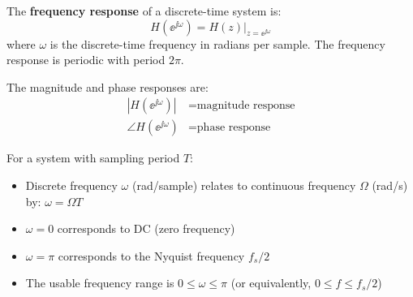 \begin{definitionbox}[title=Definition: Discrete-Time Frequency Response]
The \textbf{frequency response} of a discrete-time system is:
\begin{equation}
H(\ee^{\jj\omega}) = H(z)\big|_{z=\ee^{\jj\omega}}
\end{equation}
where $\omega$ is the discrete-time frequency in radians per sample. The frequency response is periodic with period $2\pi$.
\end{definitionbox}

The magnitude and phase responses are:
\begin{align}
|H(\ee^{\jj\omega})| &= \text{magnitude response} \\
\angle H(\ee^{\jj\omega}) &= \text{phase response}
\end{align}

\begin{practicalbox}[title=Frequency Relationships]
For a system with sampling period $T$:
\begin{itemize}
    \item Discrete frequency $\omega$ (rad/sample) relates to continuous frequency $\Omega$ (rad/s) by: $\omega = \Omega T$
    \item $\omega = 0$ corresponds to DC (zero frequency)
    \item $\omega = \pi$ corresponds to the Nyquist frequency $f_s/2$
    \item The usable frequency range is $0 \leq \omega \leq \pi$ (or equivalently, $0 \leq f \leq f_s/2$)
\end{itemize}
\end{practicalbox}

